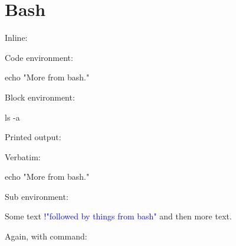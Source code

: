 \documentclass[11pt]{article}
\begin{document}
\section*{Bash}

Inline:  

Code environment:
\begin{bashcode}
echo "More from bash."
\end{bashcode}

Block environment:
\begin{bashblock}
ls -a
\end{bashblock}
Printed output:
\printpythontex[verbatim]

Verbatim:
\begin{bashverbatim}
echo "More from bash."
\end{bashverbatim}


Sub environment:
\begin{bashsub}
Some text \textcolor{blue}{!{"followed by things from bash"}} and then more text.
\end{bashsub}

Again, with command:  
\end{document}
